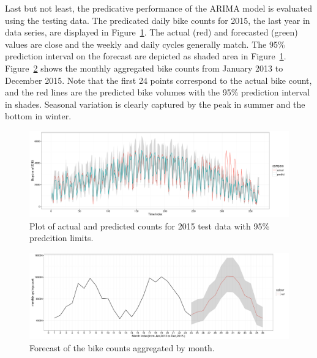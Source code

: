 \documentclass [11pt, proquest] {uwthesis}[2015/03/03]
\begin{document}
Last but not least, the predicative performance of the ARIMA model is evaluated using the testing data. The predicated daily bike counts for 2015, the last year in data series, are displayed in Figure~\ref{fig:arimapredict}. The actual (red) and forecasted (green) values are close and the weekly and daily cycles generally match. The 95\% prediction interval on the forecast are depicted as shaded area in Figure~\ref{fig:arimapredict}. Figure~\ref{fig:arimamonth} shows the monthly aggregated bike counts from January 2013 to December 2015. Note that the first 24 points correspond to the actual bike count, and the red lines are the predicted bike volumes with the 95\% prediction interval in shades. Seasonal variation is clearly captured by the peak in summer and the bottom in winter.

\begin{figure}
   \includegraphics[width=1\textwidth]{figures/prediction/predbytime_arima} 
  \caption{Plot of actual and predicted counts for 2015 test data with 95\% predcition limits.}
  \label{fig:arimapredict}
\end{figure}

\begin{figure}
   \includegraphics[width=1\textwidth]{figures/prediction/pred_month} 
  \caption{Forecast of the bike counts aggregated by month.}
  \label{fig:arimamonth}
\end{figure}
\end{document}
